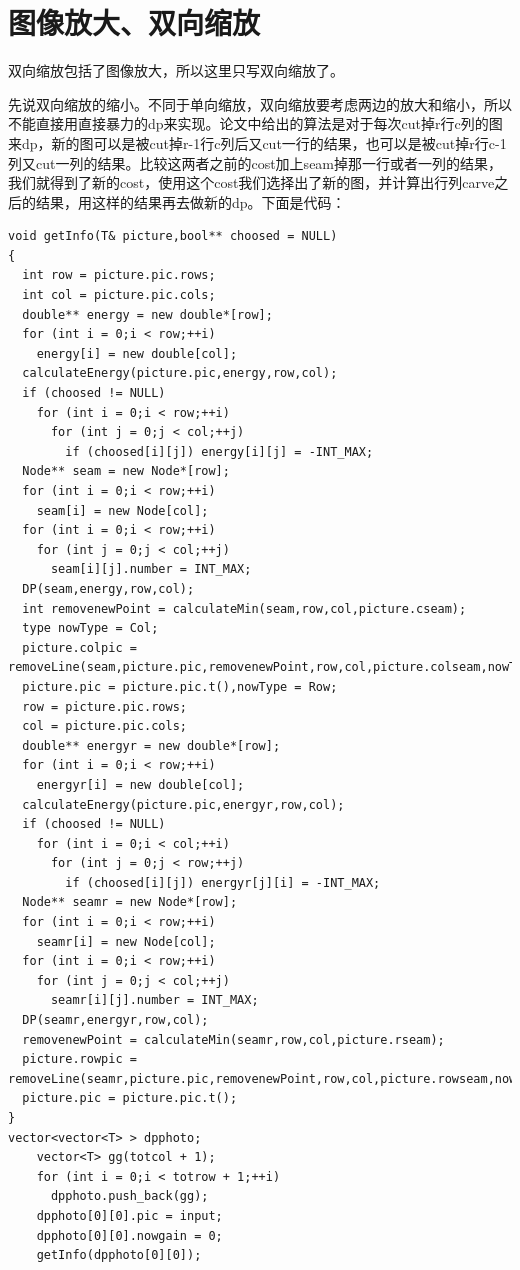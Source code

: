\documentclass[10pt, a4paper]{article}
\begin{document}
  \section{图像放大、双向缩放}
    双向缩放包括了图像放大，所以这里只写双向缩放了。

    先说双向缩放的缩小。不同于单向缩放，双向缩放要考虑两边的放大和缩小，所以不能直接用直接暴力的dp来实现。论文中给出的算法是对于每次cut掉r行c列的图来dp，新的图可以是被cut掉r-1行c列后又cut一行的结果，也可以是被cut掉r行c-1列又cut一列的结果。比较这两者之前的cost加上seam掉那一行或者一列的结果，我们就得到了新的cost，使用这个cost我们选择出了新的图，并计算出行列carve之后的结果，用这样的结果再去做新的dp。下面是代码：

    \begin{lstlisting}
void getInfo(T& picture,bool** choosed = NULL)
{
  int row = picture.pic.rows;
  int col = picture.pic.cols;
  double** energy = new double*[row];
  for (int i = 0;i < row;++i)
    energy[i] = new double[col];
  calculateEnergy(picture.pic,energy,row,col);
  if (choosed != NULL)
    for (int i = 0;i < row;++i)
      for (int j = 0;j < col;++j)
        if (choosed[i][j]) energy[i][j] = -INT_MAX;
  Node** seam = new Node*[row];
  for (int i = 0;i < row;++i)
    seam[i] = new Node[col];
  for (int i = 0;i < row;++i)
    for (int j = 0;j < col;++j)
      seam[i][j].number = INT_MAX;
  DP(seam,energy,row,col);
  int removenewPoint = calculateMin(seam,row,col,picture.cseam);
  type nowType = Col;
  picture.colpic = removeLine(seam,picture.pic,removenewPoint,row,col,picture.colseam,nowType);
  picture.pic = picture.pic.t(),nowType = Row;
  row = picture.pic.rows;
  col = picture.pic.cols;
  double** energyr = new double*[row];
  for (int i = 0;i < row;++i)
    energyr[i] = new double[col];
  calculateEnergy(picture.pic,energyr,row,col);
  if (choosed != NULL)
    for (int i = 0;i < col;++i)
      for (int j = 0;j < row;++j)
        if (choosed[i][j]) energyr[j][i] = -INT_MAX;
  Node** seamr = new Node*[row];
  for (int i = 0;i < row;++i)
    seamr[i] = new Node[col];
  for (int i = 0;i < row;++i)
    for (int j = 0;j < col;++j)
      seamr[i][j].number = INT_MAX;
  DP(seamr,energyr,row,col);
  removenewPoint = calculateMin(seamr,row,col,picture.rseam);
  picture.rowpic = removeLine(seamr,picture.pic,removenewPoint,row,col,picture.rowseam,nowType).t();
  picture.pic = picture.pic.t();
}
vector<vector<T> > dpphoto;
    vector<T> gg(totcol + 1);
    for (int i = 0;i < totrow + 1;++i)
      dpphoto.push_back(gg);
    dpphoto[0][0].pic = input;
    dpphoto[0][0].nowgain = 0;
    getInfo(dpphoto[0][0]);

\end{lstlisting}
\end{document}
